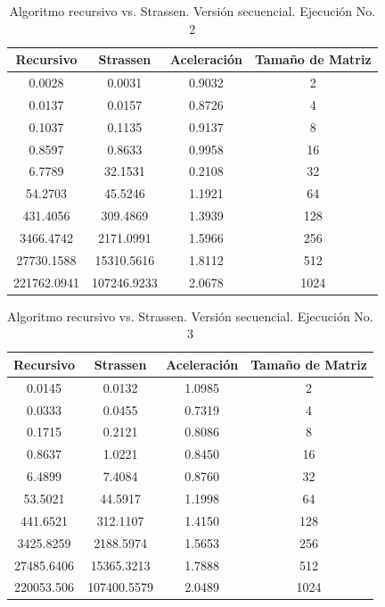 \documentclass{article}
\begin{document}
\begin{table}[ht]
\centering
\begin{tabular}{|c|c|c|c|}
\hline
\textbf{Recursivo} & \textbf{Strassen} & \textbf{Aceleración} & \textbf{Tamaño de Matriz} \\
\hline
0.0028 & 0.0031 & 0.9032 & 2 \\
0.0137 & 0.0157 & 0.8726 & 4 \\
0.1037 & 0.1135 & 0.9137 & 8 \\
0.8597 & 0.8633 & 0.9958 & 16 \\
6.7789 & 32.1531 & 0.2108 & 32 \\
54.2703 & 45.5246 & 1.1921 & 64 \\
431.4056 & 309.4869 & 1.3939 & 128 \\
3466.4742 & 2171.0991 & 1.5966 & 256 \\
27730.1588 & 15310.5616 & 1.8112 & 512 \\
221762.0941 & 107246.9233 & 2.0678 & 1024 \\
\hline
\end{tabular}
\caption{Algoritmo recursivo vs. Strassen. Versión secuencial. Ejecución No. 2}
\end{table}

\begin{table}[ht]
\centering
\begin{tabular}{|c|c|c|c|}
\hline
\textbf{Recursivo} & \textbf{Strassen} & \textbf{Aceleración} & \textbf{Tamaño de Matriz} \\
\hline
0.0145 & 0.0132 & 1.0985 & 2 \\
0.0333 & 0.0455 & 0.7319 & 4 \\
0.1715 & 0.2121 & 0.8086 & 8 \\
0.8637 & 1.0221 & 0.8450 & 16 \\
6.4899 & 7.4084 & 0.8760 & 32 \\
53.5021 & 44.5917 & 1.1998 & 64 \\
441.6521 & 312.1107 & 1.4150 & 128 \\
3425.8259 & 2188.5974 & 1.5653 & 256 \\
27485.6406 & 15365.3213 & 1.7888 & 512 \\
220053.506 & 107400.5579 & 2.0489 & 1024 \\
\hline
\end{tabular}
\caption{Algoritmo recursivo vs. Strassen. Versión secuencial. Ejecución No. 3}
\end{table}
\end{document}
